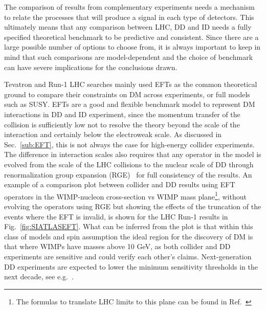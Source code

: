 The comparison of results from complementary experiments needs a mechanism to relate the processes
that will produce a signal in each type of detectors. This ultimately means that any comparison between LHC, DD and ID
needs a fully specified theoretical benchmark to be predictive and consistent. Since there are a large possible number of options to choose from, it is always important to keep in mind that such comparisons are model-dependent and the choice of benchmark can have severe implications for the conclusions drawn. 


Tevatron and Run-1 LHC searches mainly used EFTs as the common theoretical ground to compare their constraints on DM across experiments, or full models such as SUSY. EFTs are a good and flexible benchmark model to represent DM interactions in DD and ID experiment, since the momentum transfer of the collision is sufficiently low not to resolve the theory beyond the scale of the interaction and certainly below the electroweak scale. As discussed in Sec.~\ref{sub:EFT}, this is not always the case for high-energy collider experiments. The difference in interaction scales also requires that any operator in the model is evolved from the scale of the LHC collisions to the nuclear scale of DD through renormalization group expansion (RGE)~\cite{DEramo:2014nmf} for full consistency of the results. %
An example of a comparison plot between collider and DD results using EFT operators in the WIMP-nucleon cross-section vs WIMP mass plane\footnote{The formulas to translate LHC limits to this plane can be found in Ref.~\cite{Goodman:2010ku}}, without evolving the operators using RGE but showing the effects of the truncation of the events where the EFT is invalid, is shown for the LHC Run-1 results in Fig.~\ref{fig:SIATLASEFT}. %
What can be inferred from the plot is that within this class of models and spin assumption %
the ideal region for the discovery of DM is that where WIMPs have masses above 10 GeV, as both collider and DD experiments are sensitive and could verify each other's claims. Next-generation DD experiments are expected to lower the minimum sensitivity thresholds in the next decade, see e.g.~\cite{Agnese:2016cpb}. 


